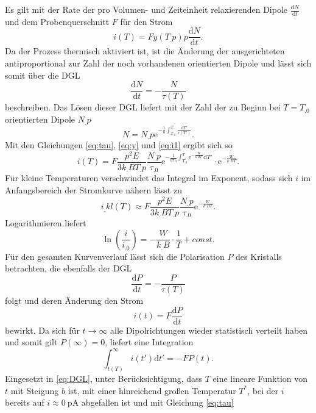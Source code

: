 Es gilt mit der Rate der pro Volumen- und Zeiteinheit relaxierenden Dipole $\frac{\mathrm{d}N}{\mathrm{d}t}$ und dem Probenquerschnitt $F$ für den Strom
\begin{equation}
i(T)=F y(T_.p)p\frac{\mathrm{d}N}{\mathrm{d}t}\text{.}\label{eq:i1}
\end{equation}
Da der Prozess thermisch aktiviert ist, ist die Änderung der ausgerichteten antiproportional zur Zahl der noch vorhandenen orientierten Dipole und lässt sich somit über die DGL
\[
\frac{\mathrm{d}N}{\mathrm{d}t}=-\frac{N}{\tau(T)}
\]
beschreiben.
Das Lösen dieser DGL liefert mit der Zahl der zu Beginn bei $T=T_.0$ orientierten Dipole $N_.p$
\begin{equation}
N=N_.p\mathrm{e}^{-\frac{1}{b}\int_{T_.0}^T\frac{\mathrm{d}T'}{\tau(T')}}\text{.}\label{eq:N}
\end{equation}
Mit den Gleichungen \eqref{eq:tau}, \eqref{eq:y} und \eqref{eq:i1} ergibt sich so
\begin{equation}
i(T)=F\frac{p^2E}{3k_.BT_.p}\frac{N_.p}{\tau_.0}\mathrm{e}^{-\frac{1}{b\tau_.0}\int_{T_.0}^T\mathrm{e}^{-\frac{W}{k_.BT'}}\mathrm{d}T'}\cdot \mathrm{e}^{-\frac{W}{k_.BT}}\text{.}\label{eq:i2}
\end{equation}
Für kleine Temperaturen verschwindet das Integral im Exponent, sodass sich $i$ im Anfangsbereich der Stromkurve nähern lässt zu
\begin{equation}
i_.{kl}(T)\approx F\frac{p^2E}{3k_.BT_.p}\frac{N_.p}{\tau_.0}\mathrm{e}^{-\frac{W}{k_.BT}}\text{.}\label{eq:i_kl}
\end{equation}
Logarithmieren liefert 
\begin{equation}
\ln\left(\frac{i}{i_.0}\right)=-\frac{W}{k_.B}\cdot\frac{1}{T}+const\text{.}\label{eq:ln1}
\end{equation}
Für den gesamten Kurvenverlauf lässt sich die Polarisation $P$ des Kristalls betrachten, die ebenfalls der DGL
\begin{equation}
\frac{\mathrm{d}P}{\mathrm{d}t}=-\frac{P}{\tau(T)}\label{eq:DGL}
\end{equation}
folgt und deren Änderung den Strom
\[
i(t)=F\frac{\mathrm{d}P}{\mathrm{d}t}
\]
bewirkt. Da sich für $t\rightarrow\infty$ alle Dipolrichtungen wieder statistisch verteilt haben und somit gilt $P(\infty)=0$, liefert eine Integration
\[
\int_{t(T)}^{\infty}i(t')\mathrm{d}t'=-F P(t)\text{.}
\]
Eingesetzt in \eqref{eq:DGL}, unter Berücksichtigung, dass $T$ eine lineare Funktion von $t$ mit Steigung $b$ ist, mit einer hinreichend großen Temperatur $T^*$, bei der $i$ bereits auf $i\approx\SI{0}{\pico\ampere}$ abgefallen ist und mit Gleichung \eqref{eq:tau}
